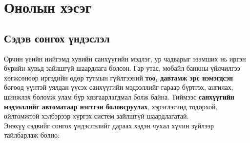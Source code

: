 ﻿%

\chapter{Онолын хэсэг}
\label{Chapter1}
\pagecolor{white}

\newcommand{\keyword}[1]{\textbf{#1}}
\newcommand{\tabhead}[1]{\textbf{#1}}
\newcommand{\code}[1]{\texttt{#1}}
\newcommand{\file}[1]{\texttt{\bfseries#1}}
\newcommand{\option}[1]{\texttt{\itshape#1}}


\newcommand{\tabletop}[1]{\rowcolor{darknavy}\textcolor{white}{\textbf{#1}}}


\section{Сэдэв сонгох үндэслэл}
Орчин үеийн нийгэмд хувийн санхүүгийн мэдлэг, ур чадварыг эзэмших нь иргэн бүрийн хувьд зайлшгүй шаардлага болсон. Гар утас, мобайл банкны үйлчилгээ хөгжсөнөөр иргэдийн өдөр тутмын гүйлгээний \textbf{тоо, давтамж эрс нэмэгдсэн} бөгөөд үүнтэй уялдан үүсэх санхүүгийн мэдээллийг гараар бүртгэх, ангилах, шинжлэх боломж улам бүр хязгаарлагдмал болж байна. Тиймээс \textbf{санхүүгийн мэдээллийг автоматаар нэгтгэн боловсруулах}, хэрэглэгчид тодорхой, ойлгомжтой хэлбэрээр хүргэх систем зайлшгүй шаардлагатай.\\

Энэхүү сэдвийг сонгох үндэслэлийг дараах хэдэн чухал хүчин зүйлээр тайлбарлаж болно:

